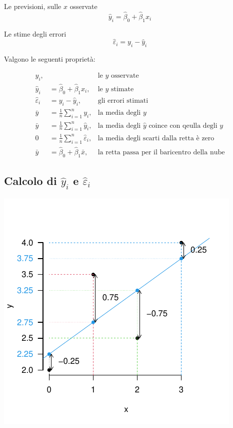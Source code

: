 \documentclass[
  11pt,
]{book}
\theoremstyle{mytheoremstyle}
\theoremstyle{mydefstyle}
\begin{document}
Le previsioni, sulle \(x\) osservate
\[\hat y_i=\hat\beta_0+\hat\beta_1x_i\]

Le stime degli errori
\[\hat\varepsilon_i = y_i-\hat y_i\]

Valgono le seguenti proprietà:

\begin{info}
\[
\begin{aligned}
y_i, & & \text{le $y$ osservate}\\
\hat y_i &= \hat \beta_0+\hat\beta_1x_i,&\text{le $y$ stimate}\\
\hat\varepsilon_i &= y_i-\hat y_i,&\text{gli errori stimati}\\
\bar y &= \frac 1 n\sum_{i=1}^n y_i, &\text{la media degli $y$}\\
\bar y &= \frac 1 n\sum_{i=1}^n \hat y_i, &\text{la media degli $\hat y$ coince con qeulla degli $y$}\\
0 &=\frac 1 n\sum_{i=1}^n\hat\varepsilon_i , &\text{la media degli scarti dalla retta è zero}\\
\bar y &= \hat\beta_0+\hat\beta_1 \bar x , &\text{la retta passa per il baricentro della nube}
\end{aligned}
\]

\end{info}

\subsection{\texorpdfstring{Calcolo di \(\hat y_i\) e \(\hat\varepsilon_i\)}{Calcolo di \textbackslash hat y\_i e \textbackslash hat\textbackslash varepsilon\_i}}\label{calcolo-di-hat-y_i-e-hatvarepsilon_i}

\begin{center}\includegraphics{Appunti_di_Statistica_2025_files/figure-latex/17-regressione-I-45-1} \end{center}
\end{document}

